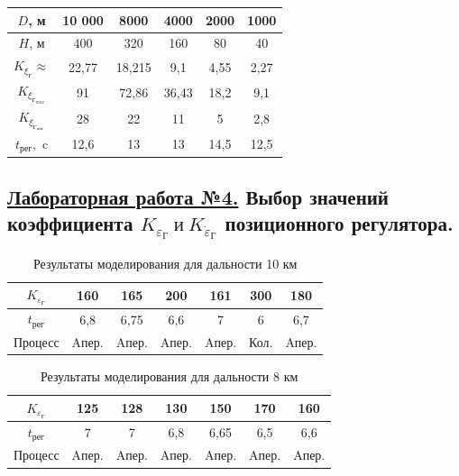 \begin{table}[H]
    \centering
    \begin{tabular}{c|c|c|c|c|c}
    \hline
        $D$, м & 10 000 & 8000 & 4000 & 2000 & 1000  \\ \hline
        $H$, м & 400 & 320 & 160 & 80 & 40  \\ \hline
        $K_{\xi_\text{Г}} \approx$ & 22,77 & 18,215 & 9,1 & 4,55 & 2,27  \\ \hline
        $K_{\xi_\text{Г}_{max}}$ & 91 & 72,86 & 36,43 & 18,2 & 9,1  \\ \hline
        $K_{\xi_\text{Г}_\text{опт}}$ & 28 & 22 & 11 & 5 & 2,8  \\ \hline
        $t_\text{рег},$ c & 12,6 & 13 & 13 & 14,5 & 12,5  \\ \hline
    \end{tabular}
\end{table}

\begin{center}
    \subsection*{\underline{ Лабораторная работа №4.} Выбор значений коэффициента $K_{\varepsilon_\text{Г}} \  \text{и} \  K_{\dot{\varepsilon}_\text{Г}}$
позиционного регулятора.}
\end{center}

\begin{table}[H]
    \centering
    \caption{Результаты моделирования для дальности 10 км}
    \begin{tabular}{c|c|c|c|c|c|c}
    \hline
        $K_{\varepsilon_\text{Г}}$ & 160 & 165 &\cellcolor{cyan} 200 & 161 & 300 & 180  \\ \hline
        $t_\text{рег}$ & 6,8 & 6,75 &\cellcolor{cyan} 6,6 & 7 & 6 & 6,7  \\ \hline
        Процесс & Aпер. & Aпер. & \cellcolor{cyan}Aпер. & Aпер. & Кол. & Aпер.  \\ \hline
    \end{tabular}
    \label{tab:10KM}
\end{table}

\begin{table}[H]
    \centering
    \caption{Результаты моделирования для дальности 8 км}
    \begin{tabular}{c|c|c|c|c|c|c}
    \hline
        $K_{\varepsilon_\text{Г}}$& 125 & 128 & 130 & 150 & \cellcolor{cyan}170 & 160  \\ \hline
        $t_\text{рег}$ & 7 & 7 & 6,8 & 6,65 & \cellcolor{cyan}6,5 & 6,6  \\ \hline
        Процесс& Aпер. & Aпер. & Aпер. & Aпер. & \cellcolor{cyan}Aпер. &Aпер.\\ \hline
    \end{tabular}
    \label{tab:10KM}
\end{table}

